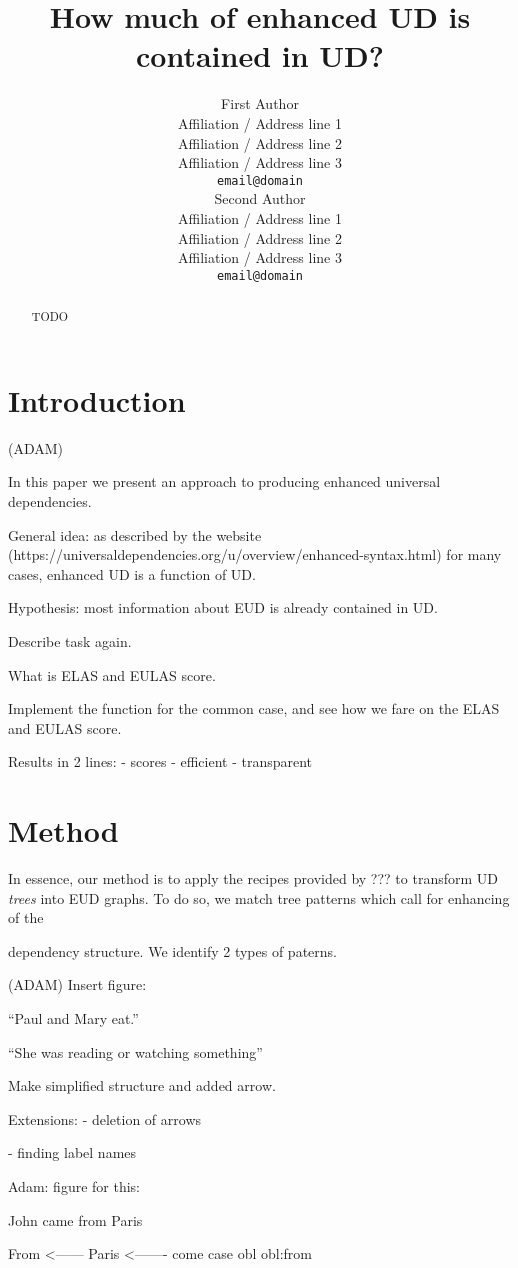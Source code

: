 \documentclass[11pt,a4paper]{article}
\title{How much of enhanced UD is contained in UD?}
\author{First Author \\
  Affiliation / Address line 1 \\
  Affiliation / Address line 2 \\
  Affiliation / Address line 3 \\
  \texttt{email@domain} \\\And
  Second Author \\
  Affiliation / Address line 1 \\
  Affiliation / Address line 2 \\
  Affiliation / Address line 3 \\
  \texttt{email@domain} \\}
\date{}
\begin{document}
\maketitle
\begin{abstract}
  TODO
\end{abstract}

\section{Introduction}
(ADAM)

In this paper we present an approach to producing enhanced universal
dependencies.

General idea: as described by the website
(https://universaldependencies.org/u/overview/enhanced-syntax.html)
for many cases, enhanced UD is a function of UD.

Hypothesis: most information about EUD is already contained in UD.

Describe task again.

What is ELAS and EULAS  score.

Implement the function for the common case, and see how we fare on the
ELAS and EULAS  score.

Results in 2 lines:
- scores
- efficient
- transparent

\section{Method}


In essence, our method is to apply the recipes provided by ??? to
transform UD \emph{trees} into EUD graphs.
To do so, we 
match tree patterns which call for enhancing of the

dependency structure. We identify 2 types of paterns.

(ADAM) Insert figure:

``Paul and Mary eat.''

``She was reading or watching something''


Make simplified structure and added arrow.

Extensions:
- deletion of arrows

- finding label names


Adam: figure for this:

John came from Paris

From <------ Paris <------- come
       case          obl
                     obl:from
\end{document}
